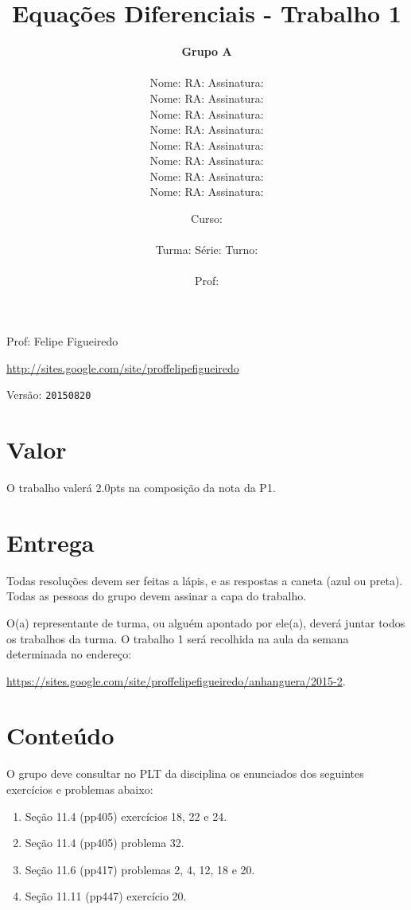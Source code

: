 \documentclass[a4paper]{article}
\date{
\bigskip
Curso: \underline{\hspace{8cm}}\\
\ \\
Turma: \underline{\hspace{1cm}} Série: \underline{\hspace{1cm}} Turno:
\underline{\hspace{1cm}}\\
\ \\
Prof: \underline{\hspace{8cm}}\\
}
\title{Equações Diferenciais - Trabalho 1}
\author{
{\bf Grupo A}\\
\ \\
Nome: \underline{\hspace{6cm}} RA: \underline{\hspace{2cm}} Assinatura: \underline{\hspace{4cm}}\\
Nome: \underline{\hspace{6cm}} RA: \underline{\hspace{2cm}} Assinatura: \underline{\hspace{4cm}}\\
Nome: \underline{\hspace{6cm}} RA: \underline{\hspace{2cm}} Assinatura: \underline{\hspace{4cm}}\\
Nome: \underline{\hspace{6cm}} RA: \underline{\hspace{2cm}} Assinatura: \underline{\hspace{4cm}}\\
Nome: \underline{\hspace{6cm}} RA: \underline{\hspace{2cm}} Assinatura: \underline{\hspace{4cm}}\\
Nome: \underline{\hspace{6cm}} RA: \underline{\hspace{2cm}} Assinatura: \underline{\hspace{4cm}}\\
Nome: \underline{\hspace{6cm}} RA: \underline{\hspace{2cm}} Assinatura: \underline{\hspace{4cm}}\\
Nome: \underline{\hspace{6cm}} RA: \underline{\hspace{2cm}} Assinatura: \underline{\hspace{4cm}}\\
}
\begin{document}
\maketitle

\newpage
\parbox[c]{.825\textwidth}{\raggedright%
{Prof: Felipe Figueiredo\par}
{\url{http://sites.google.com/site/proffelipefigueiredo}\par}
}

Versão: \verb|20150820|




\section{Valor}
O trabalho valerá $2.0$pts na composição da nota da P1.

\section{Entrega}

Todas resoluções devem ser feitas a lápis, e as respostas a caneta
(azul ou preta). Todas as pessoas do grupo devem assinar a capa do
trabalho.

O(a) representante de turma, ou alguém apontado por ele(a), deverá
juntar todos os trabalhos da turma. O trabalho 1 será recolhida na
aula da semana determinada no endereço:

\url{https://sites.google.com/site/proffelipefigueiredo/anhanguera/2015-2}.

\section{Conteúdo}

O grupo deve consultar no PLT da disciplina os enunciados dos
seguintes exercícios e problemas abaixo:

\begin{enumerate}
\item Seção 11.4  (pp405) exercícios 18, 22 e 24.
\item Seção 11.4  (pp405) problema 32.
\item Seção 11.6  (pp417) problemas 2, 4, 12, 18 e 20.
\item Seção 11.11 (pp447) exercício 20.
\end{enumerate}
\end{document}
